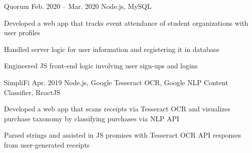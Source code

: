 \begin{cvprojects}
  \cvproject
  {Quorum}
  {\href{https://github.com/KevinIsMyName/Quorum}{\faGithubSquare\acvHeaderIconSep\@KevinIsMyName}}
  {Feb. 2020 -- Mar. 2020}
  {Node.js, MySQL}
  {
    \begin{cvitems}
      \item {Developed a web app that tracks event attendance of student organizations with user profiles}
      \item {Handled server logic for user information and registering it in database}
      \item {Engineered JS front-end logic involving user sign-ups and logins}
    \end{cvitems}
  }

  \cvproject
  {SimpliFi}
  {\href{https://github.com/unitehenry/simply-finance}{\faGithubSquare\acvHeaderIconSep{}}}
  {Apr. 2019}
  {Node.js, Google Tesseract OCR, Google NLP Content Classifier, ReactJS}
  {
    \begin{cvitems}
      \item {Developed a web app that scans receipts via Tesseract OCR and visualizes purchase taxonomy by classifying purchases via NLP API}
      \item {Parsed strings and assisted in JS promises with Tesseract OCR API responses from user-generated receipts}
    \end{cvitems}
  }


\end{cvprojects}